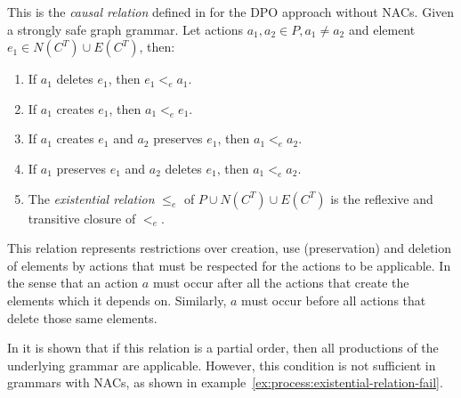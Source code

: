 \begin{definition} This is the \emph{causal relation} defined in \cite{Corradini1996} for the DPO approach without NACs. Given  \doublyTypedGraphGrammarCore{} a strongly safe graph grammar. Let actions \mbox{$a_1, a_2 \in P, a_1 \ne a_2$} and element \mbox{$e_1 \in N(C^T) \cup E(C^T)$}, then:

  \begin{enumerate}
    \item If $a_1$ deletes $e_1$, then $e_1 <_e a_1$.
    \item If $a_1$ creates $e_1$, then $a_1 <_e e_1$.
    \item If $a_1$ creates $e_1$ and $a_2$ preserves $e_1$, then $a_1 <_e a_2$.
    \item If $a_1$ preserves $e_1$ and $a_2$ deletes $e_1$, then $a_1 <_e a_2$. 
    \item The \emph{existential relation} $\leq_e$ of $P \cup N(C^T) \cup E(C^T)$ is the reflexive and transitive closure of $<_e$.
  \end{enumerate}
\end{definition}

This relation represents restrictions over creation, use (preservation) and deletion of elements by actions that must be respected for the actions to be applicable. In the sense that an action $a$ must occur after all the actions that create the elements which it depends on. Similarly, $a$ must occur before all actions that delete those same elements.

In \cite{Corradini1996} it is shown that if this relation is a partial order, then all productions of the underlying grammar are applicable. However, this condition is not sufficient in grammars with NACs, as shown in example~\ref{ex:process:existential-relation-fail}.

